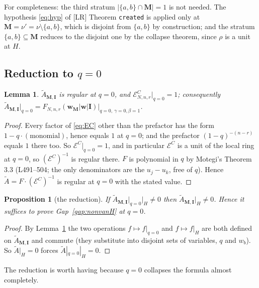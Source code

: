 \documentclass[11pt]{article}
\theoremstyle{plain}
\newtheorem{lem}[thm]{Lemma}
\newtheorem{prop}[thm]{Proposition}
\theoremstyle{definition}
\theoremstyle{remark}
\theoremstyle{plain}
\newcommand{\bI}{\mathbf{I}}
\newcommand{\bM}{\mathbf{M}}
\newcommand{\bw}{\mathbf{w}}
\newcommand{\At}{\widetilde{A}}
\begin{document}
For completeness: the third stratum $|\{a,b\}\cap\bM|=1$ is not needed.  The
hypothesis \eqref{eq:hyp} of [LR] Theorem \texttt{created} is applied only at
$\bM=\nu'=\nu\setminus\{a,b\}$, which is disjoint from $\{a,b\}$ by
construction; and the stratum $\{a,b\}\subseteq\bM$ reduces to the disjoint one
by the collapse theorem, since $\rho$ is a unit at $H$.

\subsection{Reduction to \texorpdfstring{$q=0$}{q=0}}
\label{sec:q0}

\begin{lem}\label{lem:q0reg}
$\At_{\bM,\bI}$ is regular at $q=0$, and $\mathcal{E}^C_{N,n,r}|_{q=0}=1$;
consequently $\At_{\bM,\bI}|_{q=0}
=F_{N,n,r}(\bw_{\bM}|\bw|\bI)\big|_{q=0,\ \gamma=0,\beta=1}$.
\end{lem}
\begin{proof}
Every factor of \eqref{eq:EC} other than the prefactor has the form
$1-q\cdot(\text{monomial})$, hence equals $1$ at $q=0$; and the prefactor
$(1-q)^{-(n-r)}$ equals $1$ there too.  So
$\mathcal{E}^C|_{q=0}=1$, and in particular $\mathcal{E}^C$ is a unit of the
local ring at $q=0$, so $(\mathcal{E}^C)^{-1}$ is regular there.  $F$ is
polynomial in $q$ by Motegi's Theorem 3.3 (L491--504; the only denominators are
the $u_j-u_k$, free of $q$).  Hence $\At=F\cdot(\mathcal{E}^C)^{-1}$ is regular
at $q=0$ with the stated value.
\end{proof}

\begin{prop}[the reduction]\label{prop:q0}
If $\At_{\bM,\bI}\big|_{q=0}\big|_H\ne0$ then $\At_{\bM,\bI}\big|_H\ne0$.  Hence
it suffices to prove Gap~\ref{gap:nonvanH} at $q=0$.
\end{prop}
\begin{proof}
By Lemma~\ref{lem:q0reg} the two operations $f\mapsto f|_{q=0}$ and
$f\mapsto f|_H$ are both defined on $\At_{\bM,\bI}$ and commute (they
substitute into disjoint sets of variables, $q$ and $w_b$).  So
$\At|_H=0$ forces $\At|_{q=0}|_H=0$.
\end{proof}

The reduction is worth having because $q=0$ collapses the formula almost
completely.
\end{document}
